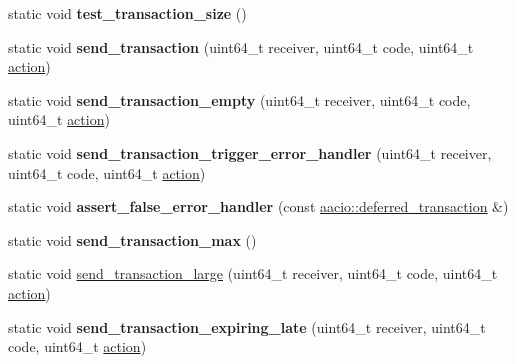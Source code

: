 \begin{DoxyCompactItemize}
\item 
\mbox{\label{structtest__transaction_a5d5d9e7ab74a37931f52a332a3a4fab4}} 
static void {\bfseries test\+\_\+transaction\+\_\+size} ()
\item 
\mbox{\label{structtest__transaction_a0fb16ed6614c7a6c7b0863aa3d356a59}} 
static void {\bfseries send\+\_\+transaction} (uint64\+\_\+t receiver, uint64\+\_\+t code, uint64\+\_\+t \mbox{\hyperlink{structaacio_1_1action}{action}})
\item 
\mbox{\label{structtest__transaction_ae391adbe7a3b664ce561cff8ba9a079e}} 
static void {\bfseries send\+\_\+transaction\+\_\+empty} (uint64\+\_\+t receiver, uint64\+\_\+t code, uint64\+\_\+t \mbox{\hyperlink{structaacio_1_1action}{action}})
\item 
\mbox{\label{structtest__transaction_afdf03fc0e6d27537b27ddebc66bf3e9c}} 
static void {\bfseries send\+\_\+transaction\+\_\+trigger\+\_\+error\+\_\+handler} (uint64\+\_\+t receiver, uint64\+\_\+t code, uint64\+\_\+t \mbox{\hyperlink{structaacio_1_1action}{action}})
\item 
\mbox{\label{structtest__transaction_a4682dffea4d937395844700ddd06253a}} 
static void {\bfseries assert\+\_\+false\+\_\+error\+\_\+handler} (const \mbox{\hyperlink{classaacio_1_1deferred__transaction}{aacio\+::deferred\+\_\+transaction}} \&)
\item 
\mbox{\label{structtest__transaction_aa81d6861dcbbf611f55223329b076e39}} 
static void {\bfseries send\+\_\+transaction\+\_\+max} ()
\item 
static void \mbox{\hyperlink{structtest__transaction_ab7633912e3a2c483ab0a6bfc987789a0}{send\+\_\+transaction\+\_\+large}} (uint64\+\_\+t receiver, uint64\+\_\+t code, uint64\+\_\+t \mbox{\hyperlink{structaacio_1_1action}{action}})
\item 
\mbox{\label{structtest__transaction_aecfa42f5de6473aa74a9d4ad055bdc67}} 
static void {\bfseries send\+\_\+transaction\+\_\+expiring\+\_\+late} (uint64\+\_\+t receiver, uint64\+\_\+t code, uint64\+\_\+t \mbox{\hyperlink{structaacio_1_1action}{action}})

\end{DoxyCompactItemize}

